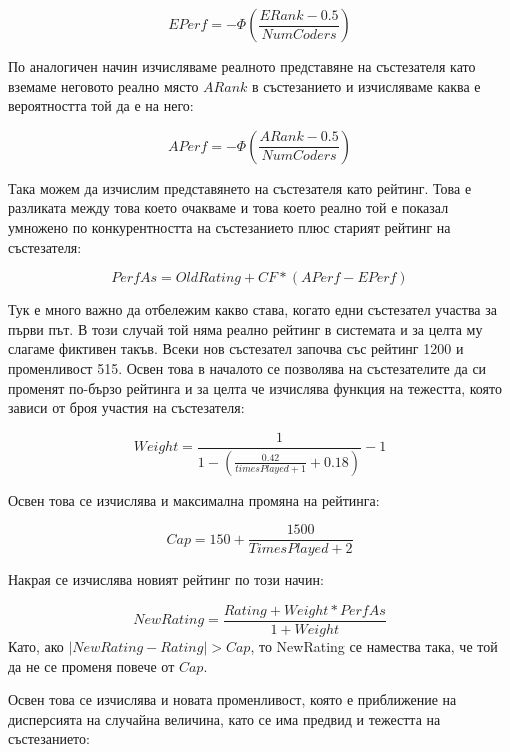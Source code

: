 \documentclass[a4paper,12pt]{article}
\begin{document}
  \begin{equation}
    EPerf=-\Phi\left(\frac{ERank - 0.5}{NumCoders}\right)
  \end{equation}
  
  По аналогичен начин изчисляваме реалното представяне на състезателя като вземаме неговото реално място \(ARank\) в състезанието и изчисляваме каква е вероятността той да е на него:

  \begin{equation}
    APerf=-\Phi\left(\frac{ARank - 0.5}{NumCoders}\right)
  \end{equation}
  
  Така можем да изчислим представянето на състезателя като рейтинг. Това е разликата между това което очакваме и това което реално той е показал умножено по конкурентността на състезанието плюс старият рейтинг на състезателя:
  
  \begin{equation}
    PerfAs = OldRating + CF*(APerf - EPerf)
  \end{equation}

  Тук е много важно да отбележим какво става, когато едни състезател участва за първи път. В този случай той няма реално рейтинг в системата и за целта му слагаме фиктивен такъв. Всеки нов състезател започва със рейтинг 1200 и променливост 515. Освен това в началото се позволява на състезателите да си променят по-бързо рейтинга и за целта че изчислява функция на тежестта, която зависи от броя участия на състезателя:
  
  \begin{equation}
    Weight = \frac{1}{1 - \left(\frac{0.42}{timesPlayed + 1} + 0.18\right)} - 1
  \end{equation}
  
  Освен това се изчислява и максимална промяна на рейтинга:
  
  \begin{equation}
    Cap = 150 + \frac{1500}{TimesPlayed + 2}
  \end{equation}
  
  Накрая се изчислява новият рейтинг по този начин:
  
  \begin{equation}
    NewRating = \frac{Rating + Weight * PerfAs}{1 + Weight}
  \end{equation}
  Като, ако \(|NewRating - Rating| > Cap\), то NewRating се намества така, че той да не се променя повече от \(Cap\).
  
  Освен това се изчислява и новата променливост, която е приближение на дисперсията на случайна величина, като се има предвид и тежестта на състезанието:
  
\end{document}
